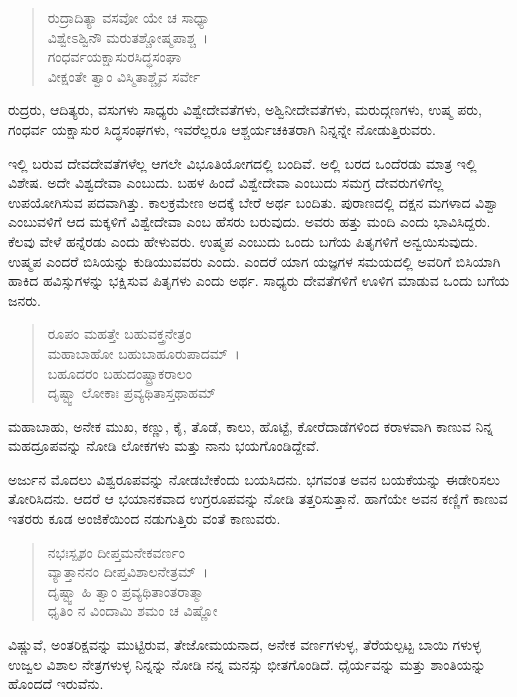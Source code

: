 \begin{verse}
ರುದ್ರಾದಿತ್ಯಾ ವಸವೋ ಯೇ ಚ ಸಾಧ್ಯಾ \\ ವಿಶ್ವೇಽಶ್ವಿನೌ ಮರುತಶ್ಚೋಷ್ಮಪಾಶ್ಚ~।\\ಗಂಧರ್ವಯಕ್ಷಾಸುರಸಿದ್ಧಸಂಘಾ \\ ವೀಕ್ಷಂತೇ ತ್ವಾಂ ವಿಸ್ಮಿತಾಶ್ಚೈವ ಸರ್ವೇ 
\end{verse}

{\small ರುದ್ರರು, ಆದಿತ್ಯರು, ವಸುಗಳು ಸಾಧ್ಯರು ವಿಶ್ವೇದೇವತೆಗಳು, ಅಶ್ವಿನೀದೇವತೆಗಳು, ಮರುದ್ಗಣಗಳು, ಉಷ್ಮ ಪರು, ಗಂಧರ್ವ ಯಕ್ಷಾಸುರ ಸಿದ್ಧಸಂಘಗಳು, ಇವರೆಲ್ಲರೂ ಆಶ್ಚರ್ಯಚಕಿತರಾಗಿ ನಿನ್ನನ್ನೇ ನೋಡುತ್ತಿರುವರು.}

ಇಲ್ಲಿ ಬರುವ ದೇವದೇವತೆಗಳೆಲ್ಲ ಆಗಲೇ ವಿಭೂತಿಯೋಗದಲ್ಲಿ ಬಂದಿವೆ. ಅಲ್ಲಿ ಬರದ ಒಂದೆರಡು ಮಾತ್ರ ಇಲ್ಲಿ ವಿಶೇಷ. ಅದೇ ವಿಶ್ವದೇವಾ ಎಂಬುದು. ಬಹಳ ಹಿಂದೆ ವಿಶ್ವೇದೇವಾ ಎಂಬುದು ಸಮಗ್ರ ದೇವರುಗಳಿಗೆಲ್ಲ ಉಪಯೋಗಿಸುವ ಪದವಾಗಿತ್ತು. ಕಾಲಕ್ರಮೇಣ ಅದಕ್ಕೆ ಬೇರೆ ಅರ್ಥ ಬಂದಿತು. ಪುರಾಣದಲ್ಲಿ ದಕ್ಷನ ಮಗಳಾದ ವಿಶ್ವಾ ಎಂಬುವಳಿಗೆ ಆದ ಮಕ್ಕಳಿಗೆ ವಿಶ್ವೇದೇವಾ ಎಂಬ ಹೆಸರು ಬರುವುದು. ಅವರು ಹತ್ತು ಮಂದಿ ಎಂದು ಭಾವಿಸಿದ್ದರು. ಕೆಲವು ವೇಳೆ ಹನ್ನೆರಡು ಎಂದು ಹೇಳುವರು. ಉಷ್ಮಪ ಎಂಬುದು ಒಂದು ಬಗೆಯ ಪಿತೃಗಳಿಗೆ ಅನ್ವಯಿಸುವುದು. ಉಷ್ಮಪ ಎಂದರೆ ಬಿಸಿಯನ್ನು ಕುಡಿಯುವವರು ಎಂದು. ಎಂದರೆ ಯಾಗ ಯಜ್ಞಗಳ ಸಮಯದಲ್ಲಿ ಅವರಿಗೆ ಬಿಸಿಯಾಗಿ ಹಾಕಿದ ಹವಿಸ್ಸುಗಳನ್ನು ಭಕ್ಷಿಸುವ ಪಿತೃಗಳು ಎಂದು ಅರ್ಥ. ಸಾಧ್ಯರು ದೇವತೆಗಳಿಗೆ ಊಳಿಗ ಮಾಡುವ ಒಂದು ಬಗೆಯ ಜನರು.

\begin{verse}
ರೂಪಂ ಮಹತ್ತೇ ಬಹುವಕ್ತ್ರನೇತ್ರಂ \\ ಮಹಾಬಾಹೋ ಬಹುಬಾಹೂರುಪಾದಮ್~।\\ಬಹೂದರಂ ಬಹುದಂಷ್ಟ್ರಾಕರಾಲಂ \\ ದೃಷ್ಟ್ವಾ ಲೋಕಾಃ ಪ್ರವ್ಯಥಿತಾಸ್ತಥಾಹಮ್ 
\end{verse}

{\small ಮಹಾಬಾಹು, ಅನೇಕ ಮುಖ, ಕಣ್ಣು, ಕೈ, ತೊಡೆ, ಕಾಲು, ಹೊಟ್ಟೆ, ಕೋರೆದಾಡೆಗಳಿಂದ ಕರಾಳವಾಗಿ ಕಾಣುವ ನಿನ್ನ ಮಹದ್ರೂಪವನ್ನು ನೋಡಿ ಲೋಕಗಳು ಮತ್ತು ನಾನು ಭಯಗೊಂಡಿದ್ದೇವೆ.}

ಅರ್ಜುನ ಮೊದಲು ವಿಶ್ವರೂಪವನ್ನು ನೋಡಬೇಕೆಂದು ಬಯಸಿದನು. ಭಗವಂತ ಅವನ ಬಯಕೆಯನ್ನು ಈಡೇರಿಸಲು ತೋರಿಸಿದನು. ಆದರೆ ಆ ಭಯಾನಕವಾದ ಉಗ್ರರೂಪವನ್ನು ನೋಡಿ ತತ್ತರಿಸುತ್ತಾನೆ. ಹಾಗೆಯೇ ಅವನ ಕಣ್ಣಿಗೆ ಕಾಣುವ ಇತರರು ಕೂಡ ಅಂಜಿಕೆಯಿಂದ ನಡುಗುತ್ತಿರು ವಂತೆ ಕಾಣುವರು.

\begin{verse}
ನಭಃಸ್ಪೃಶಂ ದೀಪ್ತಮನೇಕವರ್ಣಂ \\ ವ್ಯಾತ್ತಾನನಂ ದೀಪ್ತವಿಶಾಲನೇತ್ರಮ್~।\\ದೃಷ್ಟ್ವಾ ಹಿ ತ್ವಾಂ ಪ್ರವ್ಯಥಿತಾಂತರಾತ್ಮಾ \\ ಧೃತಿಂ ನ ವಿಂದಾಮಿ ಶಮಂ ಚ ವಿಷ್ಣೋ 
\end{verse}

{\small ವಿಷ್ಣುವೆ, ಅಂತರಿಕ್ಷವನ್ನು ಮುಟ್ಟಿರುವ, ತೇಜೋಮಯನಾದ, ಅನೇಕ ವರ್ಣಗಳುಳ್ಳ, ತೆರೆಯಲ್ಪಟ್ಟ ಬಾಯಿ ಗಳುಳ್ಳ ಉಜ್ವಲ ವಿಶಾಲ ನೇತ್ರಗಳುಳ್ಳ ನಿನ್ನನ್ನು ನೋಡಿ ನನ್ನ ಮನಸ್ಸು ಭೀತಗೊಂಡಿದೆ. ಧೈರ್ಯವನ್ನು ಮತ್ತು ಶಾಂತಿಯನ್ನು ಹೊಂದದೆ ಇರುವೆನು.}

